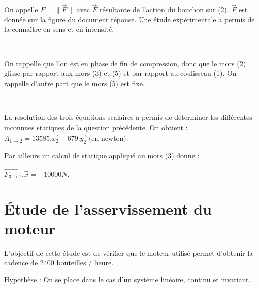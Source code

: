 On appelle $F=\|\overrightarrow{F}\|$ avec $\overrightarrow{F}$ résultante de l'action du bouchon sur (2). $\overrightarrow{F}$ est donnée sur la figure du document réponse. Une étude expérimentale a permis de la connaître en sens et en intensité.


~\

On rappelle que l'on est en phase de fin de compression, donc que le mors (2) glisse par rapport aux mors (3) et (5) et par rapport au coulisseau (1). On rappelle d'autre part que le mors (5) est fixe.


~\

La résolution des trois équations scalaires a permis de déterminer les différentes inconnues statiques de la question précédente. On obtient : $\overrightarrow{A_{1\rightarrow2}}=13585.\overrightarrow{x_2}-679.\overrightarrow{y_2}$ (en newton).

Par ailleurs un calcul de statique appliqué au mors (3) donne :

$\overrightarrow{F_{3\rightarrow1}}.\overrightarrow{x}=-10000N$.


\section{Étude de l'asservissement du moteur}

L'objectif de cette étude est de vérifier que le moteur utilisé permet d'obtenir la cadence de 2400 bouteilles / heure.

Hypothèse : On se place dans le cas d'un système linéaire, continu et invariant.

